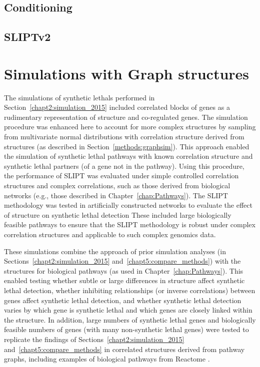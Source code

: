 \subsection{Conditioning}
\subsection{SLIPTv2}
\fi

\FloatBarrier

\section{Simulations with Graph structures}
\label{chapt5:graphsim}

The simulations of \glspl{synthetic lethal} performed in Section~\ref{chapt2:simulation_2015} included correlated blocks of genes as a rudimentary representation of  structure and co-regulated genes. The simulation procedure was enhanced here to account for more complex  structures by sampling from multivariate normal distributions with correlation structure derived from  structures (as described in Section~\ref{methods:graphsim}). This approach enabled the simulation of \gls{synthetic lethal} pathways with known correlation structure and synthetic lethal partners (of a gene not in the pathway).  Using this procedure, the performance of \gls{SLIPT} was evaluated under simple controlled correlation structures and complex correlations, such as those derived from biological networks (e.g., those described in Chapter~\ref{chap:Pathways}). The \gls{SLIPT} methodology was tested in artificially constructed networks to evaluate the effect of  structure on \gls{synthetic lethal} detection These included large biologically feasible pathways to ensure that the \gls{SLIPT} methodology is robust under complex correlation structures and applicable to such complex \glspl{genomic} data.

These simulations combine the approach of prior simulation analyses (in Sections~\ref{chapt2:simulation_2015} and~\ref{chapt5:compare_methods}) with the  structures for biological pathways (as used in Chapter~\ref{chap:Pathways}). This enabled testing whether subtle or large differences in  structure affect \gls{synthetic lethal} detection, whether inhibiting relationships (or inverse correlations) between genes affect \gls{synthetic lethal} detection, and whether \gls{synthetic lethal} detection varies by which gene is \gls{synthetic lethal} and which genes are closely linked within the  structure. In addition, large numbers of \gls{synthetic lethal} genes and biologically feasible numbers of genes (with many non-synthetic lethal genes) were tested to replicate the findings of Sections~\ref{chapt2:simulation_2015} and~\ref{chapt5:compare_methods} in correlated structures derived from pathway graphs, including examples of biological pathways from Reactome \citep{Reactome}.


